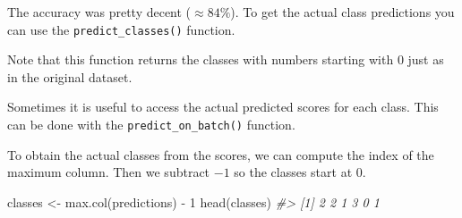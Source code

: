 \documentclass[
  11pt,
]{krantz}
\newenvironment{Shaded}{\begin{snugshade}}{\end{snugshade}}
\newcommand{\CommentTok}[1]{\textcolor[rgb]{0.37,0.37,0.37}{\textit{#1}}}
\newcommand{\DecValTok}[1]{\textcolor[rgb]{0.06,0.06,0.06}{#1}}
\newcommand{\FunctionTok}[1]{\textcolor[rgb]{0,0,0}{#1}}
\newcommand{\NormalTok}[1]{#1}
\newcommand{\OtherTok}[1]{\textcolor[rgb]{0.37,0.37,0.37}{#1}}
\newcommand{\SpecialCharTok}[1]{\textcolor[rgb]{0,0,0}{#1}}
\begin{document}
The accuracy was pretty decent (\(\approx 84\%\)). To get the actual class predictions you can use the \texttt{predict\_classes()} function.

\begin{Shaded}
\end{Shaded}

Note that this function returns the classes with numbers starting with \(0\) just as in the original dataset.

Sometimes it is useful to access the actual predicted scores for each class. This can be done with the \texttt{predict\_on\_batch()} function.

\begin{Shaded}
\end{Shaded}

To obtain the actual classes from the scores, we can compute the index of the maximum column. Then we subtract \(-1\) so the classes start at \(0\).

\begin{Shaded}
\begin{Highlighting}[]
\NormalTok{classes }\OtherTok{\textless{}{-}} \FunctionTok{max.col}\NormalTok{(predictions) }\SpecialCharTok{{-}} \DecValTok{1}
\FunctionTok{head}\NormalTok{(classes)}
\CommentTok{\#\textgreater{} [1] 2 2 1 3 0 1}
\end{Highlighting}
\end{Shaded}
\end{document}
